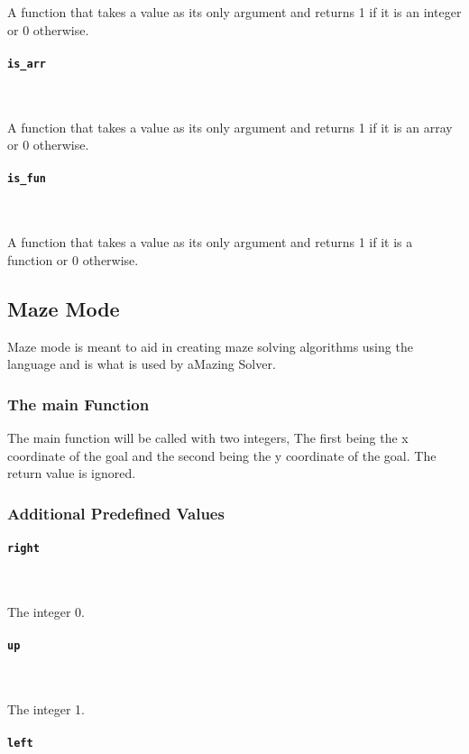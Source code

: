 A function that takes a value as its only argument and returns 1 if it is an integer or 0 otherwise.

\paragraph{\texttt{is\_arr}} \

A function that takes a value as its only argument and returns 1 if it is an array or 0 otherwise.

\paragraph{\texttt{is\_fun}} \

A function that takes a value as its only argument and returns 1 if it is a function or 0 otherwise.

\subsection{Maze Mode}

Maze mode is meant to aid in creating maze solving algorithms using the language and is what is used by aMazing Solver.

\subsubsection{The main Function}

The main function will be called with two integers, The first being the x coordinate of the goal and the second being the y coordinate of the goal. The return value is ignored.

\subsubsection{Additional Predefined Values}

\paragraph{\texttt{right}} \

The integer 0.

\paragraph{\texttt{up}} \

The integer 1.

\paragraph{\texttt{left}} \

